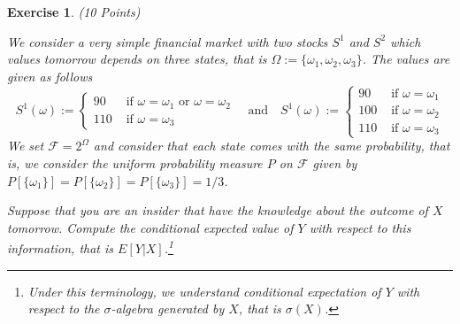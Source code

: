 \documentclass[DIV=classic,a4paper,10pt]{scrartcl}
\newtheorem{exercise}[theorem]{Exercise}
\theoremstyle{nonumberplain}
\numberwithin{equation}{section}
\begin{document}
\begin{exercise} (10 Points) 

    We consider a very simple financial market with two stocks $S^1$ and $S^2$ which values tomorrow depends on three states, that is $\Omega:=\{\omega_1,\omega_2,\omega_3\}$.
    The values are given as follows
    \begin{equation*}
        S^1(\omega):=
        \begin{cases}
            90  &\text{ if }\omega=\omega_1\text{ or }\omega=\omega_2\\
            110 &\text{ if }\omega =\omega_3
        \end{cases}
        \quad \text{and}\quad
        S^1(\omega):=
        \begin{cases}
            90  &\text{ if }\omega=\omega_1\\
            100 &\text{ if }\omega=\omega_2\\
            110 &\text{ if }\omega =\omega_3
        \end{cases}
    \end{equation*}
    We set $\mathcal{F}=2^\Omega$ and consider that each state comes with the same probability, that is, we consider the uniform probability measure $P$ on $\mathcal{F}$ given by $P[\{\omega_1\}]=P[\{\omega_2\}]=P[\{\omega_3\}]=1/3$.

    Suppose that you are an insider that have the knowledge about the outcome of $X$ tomorrow.
    Compute the conditional expected value of $Y$ with respect to this information, that is $E[Y|X]$.\footnote{Under this terminology, we understand conditional expectation of $Y$ with respect to the $\sigma$-algebra generated by $X$, that is $\sigma(X)$.}
\end{exercise}
\end{document}
